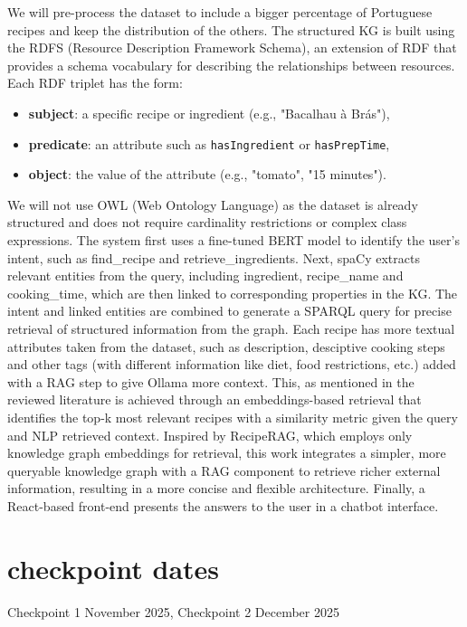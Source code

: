 \documentclass[a4paper,10pt]{article}
\begin{document}
We will pre-process the dataset to include a bigger percentage of Portuguese recipes and keep the distribution of the others. The structured KG is built using the RDFS (Resource Description Framework Schema), an extension of RDF that provides a schema vocabulary for describing the relationships between resources. Each RDF triplet has the form:
\begin{itemize}
    \item \textbf{subject}: a specific recipe or ingredient (e.g., "Bacalhau à Brás"),
    \item \textbf{predicate}: an attribute such as \texttt{hasIngredient} or \texttt{hasPrepTime},
    \item \textbf{object}: the value of the attribute (e.g., "tomato", "15 minutes").
\end{itemize}
\noindent
We will not use OWL (Web Ontology Language) as the dataset is already structured and does not require cardinality restrictions or complex class expressions.  
The system first uses a fine-tuned BERT model to identify the user’s intent, such as find\_recipe and retrieve\_ingredients. Next, spaCy extracts relevant entities from the query, including ingredient, recipe\_name and cooking\_time, which are then linked to corresponding properties in the KG. The intent and linked entities are combined to generate a SPARQL query for precise retrieval of structured information from the graph. Each recipe has more textual attributes taken from the dataset, such as description, desciptive cooking steps and other tags (with different information like diet, food restrictions, etc.) added with a RAG step to give Ollama more context. This, as mentioned in the reviewed literature is achieved through an embeddings-based retrieval that identifies the top-k most relevant recipes with a similarity metric given the query and NLP retrieved context. Inspired by RecipeRAG, which employs only knowledge graph embeddings for retrieval, this work integrates a simpler, more queryable knowledge graph with a RAG component to retrieve richer external information, resulting in a more concise and flexible architecture. Finally, a React-based front-end presents the answers to the user in a chatbot interface.

\section{checkpoint dates}

Checkpoint 1  November 2025,
Checkpoint 2  December 2025
\end{document}
